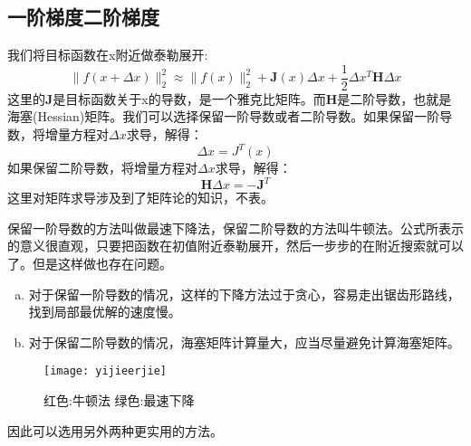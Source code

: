 \subsection{一阶梯度二阶梯度}
我们将目标函数在x附近做泰勒展开:
\begin{equation}
\|f(x+\Delta x)\|_{2}^{2} \approx\|f(x)\|_{2}^{2}+\boldsymbol{J}(x) \Delta x
+ \frac{1}{2}\Delta x^T \boldsymbol{H}\Delta x
\end{equation}
这里的$\boldsymbol{J}$是目标函数关于x的导数，是一个雅克比矩阵。而$\boldsymbol{H}$是二阶导数，也就是海塞(Hessian)矩阵。我们可以选择保留一阶导数或者二阶导数。如果保留一阶导数，将增量方程对$\Delta x$求导，解得：
\begin{equation}
	\Delta x = J^T(x)
\end{equation}
如果保留二阶导数，将增量方程对$\Delta x$求导，解得：
\begin{equation}
	\boldsymbol{H}\Delta x=-\boldsymbol{J}^T
\end{equation}
这里对矩阵求导涉及到了矩阵论的知识，不表。\par
保留一阶导数的方法叫做最速下降法，保留二阶导数的方法叫牛顿法。公式所表示的意义很直观，只要把函数在初值附近泰勒展开，然后一步步的在附近搜索就可以了。但是这样做也存在问题。
\begin{enumerate}[(a)]
	\item 对于保留一阶导数的情况，这样的下降方法过于贪心，容易走出锯齿形路线，找到局部最优解的速度慢。
	\item 对于保留二阶导数的情况，海塞矩阵计算量大，应当尽量避免计算海塞矩阵。
\end{enumerate}\par
\begin{figure}[H]
	\centering
	\texttt{[image: yijieerjie]}
	\caption{红色:牛顿法 绿色:最速下降}
\end{figure}
因此可以选用另外两种更实用的方法。

